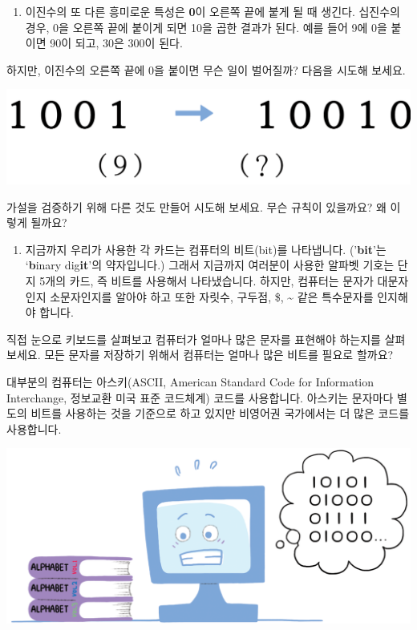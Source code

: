 \documentclass[]{article}
\begin{document}
\begin{enumerate}
\itemsep1pt\parskip0pt
\item
  이진수의 또 다른 흥미로운 특성은 \textbf{0}이 오른쪽 끝에 붙게 될 때
  생긴다. 십진수의 경우, 0을 오른쪽 끝에 붙이게 되면 10을 곱한 결과가
  된다. 예를 들어 9에 0을 붙이면 90이 되고, 30은 300이 된다.
\end{enumerate}

하지만, 이진수의 오른쪽 끝에 0을 붙이면 무슨 일이 벌어질까? 다음을
시도해 보세요.

\includegraphics{csunplugged/01-part/img/ch01-binary/01-binary-09-more-on-binary.png}

가설을 검증하기 위해 다른 것도 만들어 시도해 보세요. 무슨 규칙이
있을까요? 왜 이렇게 될까요?

\begin{enumerate}
\itemsep1pt\parskip0pt
\item
  지금까지 우리가 사용한 각 카드는 컴퓨터의 비트(bit)를 나타냅니다.
  ('\textbf{bit}'는 `\textbf{b}inary dig\textbf{it}'의 약자입니다.)
  그래서 지금까지 여러분이 사용한 알파벳 기호는 단지 5개의 카드, 즉
  비트를 사용해서 나타냈습니다. 하지만, 컴퓨터는 문자가 대문자인지
  소문자인지를 알아야 하고 또한 자릿수, 구두점, \$, \textasciitilde{}
  같은 특수문자를 인지해야 합니다.
\end{enumerate}

직접 눈으로 키보드를 살펴보고 컴퓨터가 얼마나 많은 문자를 표현해야
하는지를 살펴보세요. 모든 문자를 저장하기 위해서 컴퓨터는 얼마나 많은
비트를 필요로 할까요?

대부분의 컴퓨터는 아스키(ASCII, American Standard Code for Information
Interchange, 정보교환 미국 표준 코드체계) 코드를 사용합니다. 아스키는
문자마다 별도의 비트를 사용하는 것을 기준으로 하고 있지만 비영어권
국가에서는 더 많은 코드를 사용합니다.

\includegraphics{csunplugged/01-part/img/ch01-binary/01-binary-09-more-on-binary_02.png}
\end{document}
